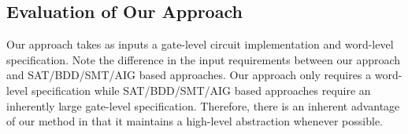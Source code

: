 \subsection{Evaluation of Our Approach}
Our approach takes as inputs a gate-level circuit implementation and
word-level specification. Note the difference in the input
requirements between our approach and SAT/BDD/SMT/AIG based
approaches. Our approach only requires a  word-level specification
while SAT/BDD/SMT/AIG based approaches require an inherently large
gate-level specification. Therefore, there is an inherent advantage of
our method in that it maintains a high-level abstraction whenever
possible.  





